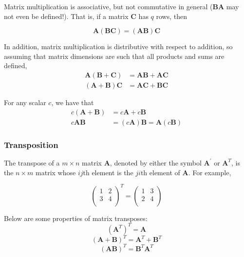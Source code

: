 \documentclass[11pt]{article}
\theoremstyle{definition}
\begin{document}
Matrix multiplication is associative, but not commutative in general ($\mathbf{BA}$ may not even be defined!).  That is, if a matrix $\mathbf{C}$ has $q$ rows, then

\[\mathbf{A}(\mathbf{BC}) = (\mathbf{AB})\mathbf{C}\]

In addition, matrix multiplication is distributive with respect to addition, so assuming that matrix dimensions are such that all products and sums are defined,
\begin{align*}
\mathbf{A} (\mathbf{B} + \mathbf{C}) &= \mathbf{AB} + \mathbf{AC}\\
(\mathbf{A} + \mathbf{B}) \mathbf{C}  &= \mathbf{AC} + \mathbf{BC}
\end{align*}

For any scalar $c$, we have that
\begin{align*}
c(\mathbf{A} + \mathbf{B}) &= c\mathbf{A} + c\mathbf{B}\\
c\mathbf{AB} &= (c\mathbf{A})\mathbf{B} = \mathbf{A}(c\mathbf{B})
\end{align*}

\subsubsection{Transposition}
The transpose of a $m \times n$ matrix $\mathbf{A}$, denoted by either the symbol $\mathbf{A}^{'}$ or $\mathbf{A}^T$, is the $n \times m$ matrix whose $ij$th element is the $ji$th element of $\mathbf{A}$.  For example,

\[
\begin{pmatrix}
    1 & 2\\
    3 & 4 \\
\end{pmatrix}^T
= 
\begin{pmatrix}
    1 & 3\\
    2 & 4 \\
\end{pmatrix}
\]

Below are some properties of matrix transposes:
\[
(\mathbf{A}^T)^T = \mathbf{A}
\]
\[
(\mathbf{A} + \mathbf{B})^{T} = \mathbf{A}^T + \mathbf{B}^T
\]
\[
(\mathbf{A}\mathbf{B})^{T} = \mathbf{B}^T\mathbf{A}^T
\]
\end{document}
